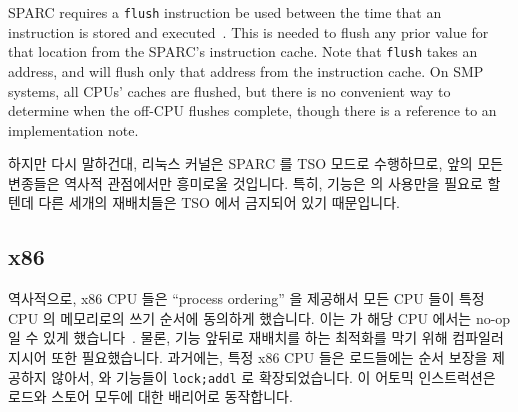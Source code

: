 SPARC requires a {\tt flush} instruction be used between the time that
an instruction is stored and executed~\cite{SPARC94}.
This is needed to flush any prior value for that location from
the SPARC's instruction cache.
Note that {\tt flush} takes an address, and will flush only that address
from the instruction cache.
On SMP systems, all CPUs' caches are flushed, but there is no
convenient way to determine when the off-CPU flushes complete,
though there is a reference to an implementation note.
\fi

하지만 다시 말하건대, 리눅스 커널은 SPARC 를 TSO 모드로 수행하므로, 앞의 모든
 변종들은 역사적 관점에서만 흥미로울 것입니다.
특히,  기능은  의 사용만을 필요로 할텐데 다른
세개의 재배치들은 TSO 에서 금지되어 있기 때문입니다.

\subsection{x86}

역사적으로, x86 CPU 들은 ``process ordering'' 을 제공해서 모든 CPU 들이 특정
CPU 의 메모리로의 쓰기 순서에 동의하게 했습니다.
이는  가 해당 CPU 에서는 no-op 일 수 있게
했습니다~\cite{IntelXeonV3-96a}.
물론,  기능 앞뒤로 재배치를 하는 최적화를 막기 위해 컴파일러
지시어 또한 필요했습니다.
과거에는, 특정 x86 CPU 들은 로드들에는 순서 보장을 제공하지 않아서,
 와  기능들이 {\tt lock;addl} 로 확장되었습니다.
이 어토믹 인스트럭션은 로드와 스토어 모두에 대한 배리어로 동작합니다.

